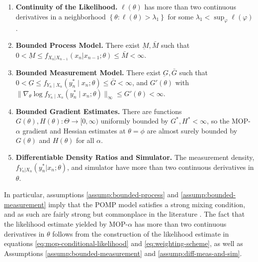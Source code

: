 \documentclass[numsec,webpdf,modern,medium,namedate]{oup-authoring-template}
\newcommand\arxiv[2]{#2} %
\theoremstyle{thmstyleone}%
\theoremstyle{thmstyletwo}%
\theoremstyle{thmstylethree}%
\begin{document}
\arxiv{}{\vspace*{-2mm}}
\begin{enumerate}[label=(A\arabic*),itemsep=-1ex, , font=\small] 
    \item \textbf{Continuity of the Likelihood.} $\ell(\theta)$ has more than two continuous derivatives in a neighborhood $\left\{\theta: \ell(\theta)>\lambda_1\right\}$ for some $\lambda_1<\sup _{\varphi} \ell(\varphi)$.\label{assump:conti-lik}
    \item \textbf{Bounded Process Model.} There exist $\underbar{M}, \bar{M}$ such that $0 < \underbar{M} \leq f_{X_n|X_{n-1}}(x_n | x_{n-1};\theta) \leq \bar{M} < \infty$.\label{assump:bounded-process}
    \item \textbf{Bounded Measurement Model.} There exist $\underbar{G}, \bar{G}$ such that $0<\underbar{G} \leq f_{Y_n \mid X_n}\left(y_n^* \mid x_n; \theta\right) \leq \bar{G}<\infty$, and $G'(\theta)$ with $\|\nabla_\theta \log f_{Y_n \mid X_n}\left(y_n^* \mid x_n; \theta\right)\|_\infty \leq G'(\theta)< \infty$.\label{assump:bounded-measurement}
    \item \textbf{Bounded Gradient Estimates.} There are functions $G(\theta), H(\theta): \Theta \to [0,\infty)$ uniformly bounded by $G^*, H^*<\infty$, so the MOP-$\alpha$ gradient and Hessian estimates at $\theta=\phi$ are almost surely bounded by $G(\theta)$ and $H(\theta)$ for all $\alpha$.\label{assump:local-bounded-derivative}
    \item \textbf{Differentiable Density Ratios and Simulator.} The measurement density, \arxiv{\\}{}$f_{Y_n|X_n}(y_n^*|x_n; \theta)$, and simulator have more than two continuous derivatives in $\theta$.\label{assump:diff-meas-and-sim}
\end{enumerate}
\arxiv{}{\vspace*{-2mm}}

In particular, assumptions \ref{assump:bounded-process} and \ref{assump:bounded-measurement} imply that the POMP model satisfies a strong mixing condition, and as such are fairly strong but commonplace in the literature \citep{karjalainen23, delMoral04}. The fact that the likelihood estimate yielded by MOP-$\alpha$ has more than two continuous derivatives in $\theta$ follows from the construction of the likelihood estimate in equations \ref{eq:mop-conditional-likelihood} and \ref{eq:weighting-scheme}, as well as Assumptions \ref{assump:bounded-measurement} and \ref{assump:diff-meas-and-sim}. 

\arxiv{}{\vspace*{-2mm}}
\end{document}
